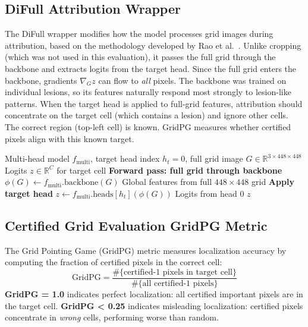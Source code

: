 \documentclass[11pt]{article}
\begin{document}
\subsection{DiFull Attribution Wrapper}

The DiFull wrapper modifies how the model processes grid images during attribution, based on the methodology developed by Rao et al.~\citep{rao2022understanding}. Unlike cropping (which was not used in this evaluation), it passes the full grid through the backbone and extracts logits from the target head. Since the full grid enters the backbone, gradients $\nabla_G z$ can flow to \emph{all} pixels. The backbone was trained on individual lesions, so its features naturally respond most strongly to lesion-like patterns. When the target head is applied to full-grid features, attribution should concentrate on the target cell (which contains a lesion) and ignore other cells.
The correct region (top-left cell) is known. GridPG measures whether certified pixels align with this known target.



\begin{algorithm}[H]
\caption{DiFull Attribution Wrapper}
\label{alg:difull_wrapper}
\begin{algorithmic}[1]
\REQUIRE Multi-head model $f_{\text{multi}}$, target head index $h_t=0$, full grid image $G \in \mathbb{R}^{3 \times 448 \times 448}$
\ENSURE Logits $z \in \mathbb{R}^C$ for target cell
\STATE \textbf{ Forward pass: full grid through backbone}
\STATE $\phi(G) \leftarrow f_{\text{multi}}.\text{backbone}(G)$ \quad  Global features from full $448 \times 448$ grid
\STATE \textbf{ Apply target head}
\STATE $z \leftarrow f_{\text{multi}}.\text{heads}[h_t](\phi(G))$ \quad  Logits from head 0
\RETURN $z$
\end{algorithmic}
\end{algorithm}


\subsection{Certified Grid Evaluation GridPG Metric}

The Grid Pointing Game (GridPG) metric \citep{rao2022understanding} measures localization accuracy by computing the fraction of certified pixels in the correct cell:
$$
\text{GridPG} = \frac{\#\{\text{certified-1 pixels in target cell}\}}{\#\{\text{all certified-1 pixels}\}}
$$
\textbf{GridPG = 1.0} indicates perfect localization: all certified important pixels are in the target cell. \textbf{GridPG < 0.25} indicates misleading localization: certified pixels concentrate in \emph{wrong} cells, performing worse than random.
\end{document}
